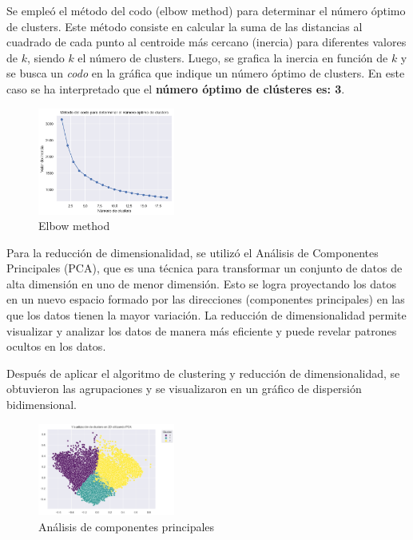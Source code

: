 \documentclass{wsdcr}
\begin{document}
Se empleó el método del codo (elbow method) para determinar el número óptimo de clusters. Este método consiste en calcular la suma de las distancias al cuadrado de cada punto al centroide más cercano (inercia) para diferentes valores de $k$, siendo $k$ el número de clusters. Luego, se grafica la inercia en función de $k$ y se busca un \textit{codo} en la gráfica que indique un número óptimo de clusters. En este caso se ha interpretado que el \textbf{número óptimo de clústeres es: 3}.

\begin{figure}[h]
    \centering
    \includegraphics[width=0.4\textwidth]{charts/elbow_method_optimum_value.png}
    \caption{Elbow method}
    \label{fig:elbowmethod}
\end{figure}

Para la reducción de dimensionalidad, se utilizó el Análisis de Componentes Principales (PCA), que es una técnica para transformar un conjunto de datos de alta dimensión en uno de menor dimensión. Esto se logra proyectando los datos en un nuevo espacio formado por las direcciones (componentes principales) en las que los datos tienen la mayor variación. La reducción de dimensionalidad permite visualizar y analizar los datos de manera más eficiente y puede revelar patrones ocultos en los datos.

Después de aplicar el algoritmo de clustering y reducción de dimensionalidad, se obtuvieron las agrupaciones y se visualizaron en un gráfico de dispersión bidimensional.

\begin{figure}[h]
    \centering
    \includegraphics[width=0.4\textwidth]{charts/normalized/kmn_pca.png}
    \caption{Análisis de componentes principales}
    \label{fig:principalcomponentanalysis}
\end{figure}
\end{document}
